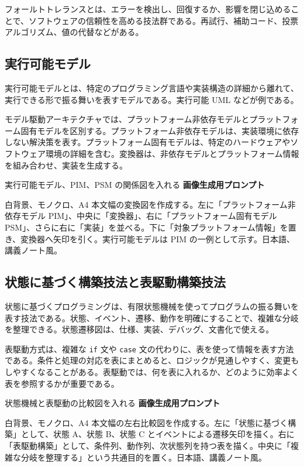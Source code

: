 \documentclass[a4paper,11pt,ja=standard,xelatex]{bxjsarticle}
\begin{document}
フォールトトレランスとは、エラーを検出し、回復するか、影響を閉じ込めることで、ソフトウェアの信頼性を高める技法群である。再試行、補助コード、投票アルゴリズム、値の代替などがある。

\subsection{実行可能モデル}

実行可能モデルとは、特定のプログラミング言語や実装構造の詳細から離れて、実行できる形で振る舞いを表すモデルである。実行可能 UML などが例である。

モデル駆動アーキテクチャでは、プラットフォーム非依存モデルとプラットフォーム固有モデルを区別する。プラットフォーム非依存モデルは、実装環境に依存しない解決策を表す。プラットフォーム固有モデルは、特定のハードウェアやソフトウェア環境の詳細を含む。変換器は、非依存モデルとプラットフォーム情報を組み合わせ、実装を生成する。

\begin{todobox}{実行可能モデル、PIM、PSM の関係図を入れる}
\textbf{画像生成用プロンプト}

白背景、モノクロ、A4 本文幅の変換図を作成する。左に「プラットフォーム非依存モデル PIM」、中央に「変換器」、右に「プラットフォーム固有モデル PSM」、さらに右に「実装」を並べる。下に「対象プラットフォーム情報」を置き、変換器へ矢印を引く。実行可能モデルは PIM の一例として示す。日本語、講義ノート風。
\end{todobox}

\subsection{状態に基づく構築技法と表駆動構築技法}

状態に基づくプログラミングは、有限状態機械を使ってプログラムの振る舞いを表す技法である。状態、イベント、遷移、動作を明確にすることで、複雑な分岐を整理できる。状態遷移図は、仕様、実装、デバッグ、文書化で使える。

表駆動方式は、複雑な \texttt{if} 文や \texttt{case} 文の代わりに、表を使って情報を表す方法である。条件と処理の対応を表にまとめると、ロジックが見通しやすく、変更もしやすくなることがある。表駆動では、何を表に入れるか、どのように効率よく表を参照するかが重要である。

\begin{todobox}{状態機械と表駆動の比較図を入れる}
\textbf{画像生成用プロンプト}

白背景、モノクロ、A4 本文幅の左右比較図を作成する。左に「状態に基づく構築」として、状態 A、状態 B、状態 C とイベントによる遷移矢印を描く。右に「表駆動構築」として、条件列、動作列、次状態列を持つ表を描く。中央に「複雑な分岐を整理する」という共通目的を置く。日本語、講義ノート風。
\end{todobox}
\end{document}
